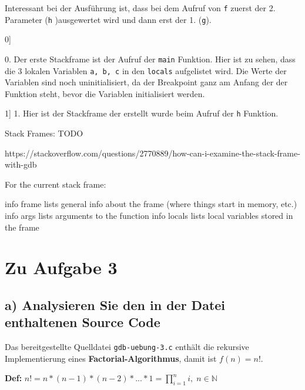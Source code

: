 \documentclass[12pt]{article}
\begin{document}
{Interessant bei der Ausführung ist, dass bei dem Aufruf von \texttt{f} zuerst der 2. Parameter (\texttt{h} )ausgewertet wird und dann erst der 1. (\texttt{g}).
\newcommand{\imageseries}[1]{
\begin{center}
	\imageseriesExcercise[2][c][#1]
\end{center}
}

\imageseries[0]

0. Der erste Stackframe ist der Aufruf der \texttt{main} Funktion. Hier ist zu sehen, dass die 3 lokalen Variablen \texttt{a, b, c} in den \texttt{locals} aufgelistet wird. 
Die Werte der Variablen sind noch uninitialisiert, da der Breakpoint ganz am Anfang der der Funktion steht, bevor die Variablen initialisiert werden.

\imageseries[1]
1. Hier ist der Stackframe der erstellt wurde beim Aufruf der  \texttt{h} Funktion. 


Stack Frames: TODO

https://stackoverflow.com/questions/2770889/how-can-i-examine-the-stack-frame-with-gdb


For the current stack frame:

    info frame lists general info about the frame (where things start in memory, etc.)
    info args lists arguments to the function
    info locals lists local variables stored in the frame



















\newpage
\section{Zu Aufgabe 3}
\subsection{a) Analysieren Sie den in der Datei enthaltenen Source Code}
Das bereitgestellte Quelldatei \texttt{gdb-uebung-3.c} enthält die rekursive Implementierung eines \textbf{Factorial-Algorithmus}, damit ist $f(n) = n! $.

\textbf{Def:} $ n! = n * (n-1) * (n-2) * ... * 1 = \prod_{i = 1}^{n} i ,\;  n \in \mathbb{N} $

}
\end{document}
